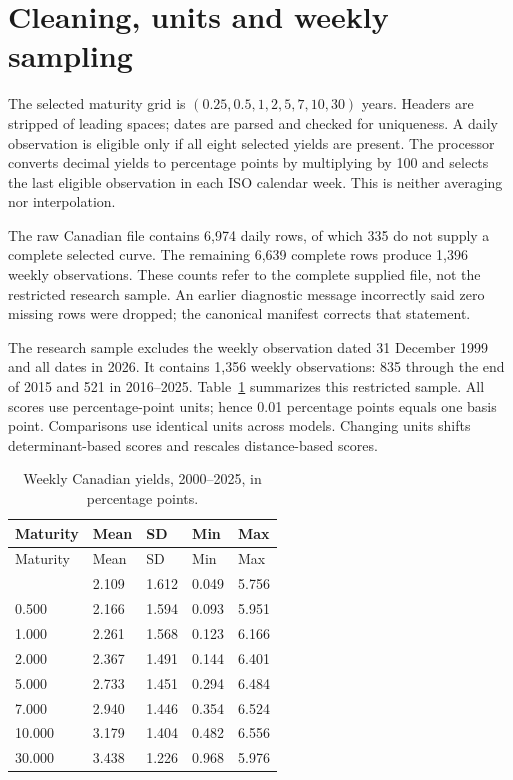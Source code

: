 \documentclass[
  12pt,
  letterpaper,
  DIV=11,
  numbers=noendperiod]{scrreprt}
\begin{document}
\section{Cleaning, units and weekly
sampling}\label{cleaning-units-and-weekly-sampling}

The selected maturity grid is \((0.25,0.5,1,2,5,7,10,30)\) years.
Headers are stripped of leading spaces; dates are parsed and checked for
uniqueness. A daily observation is eligible only if all eight selected
yields are present. The processor converts decimal yields to percentage
points by multiplying by 100 and selects the last eligible observation
in each ISO calendar week. This is neither averaging nor interpolation.

The raw Canadian file contains 6,974 daily rows, of which 335 do not
supply a complete selected curve. The remaining 6,639 complete rows
produce 1,396 weekly observations. These counts refer to the complete
supplied file, not the restricted research sample. An earlier diagnostic
message incorrectly said zero missing rows were dropped; the canonical
manifest corrects that statement.

The research sample excludes the weekly observation dated 31 December
1999 and all dates in 2026. It contains 1,356 weekly observations: 835
through the end of 2015 and 521 in 2016--2025. Table~\ref{tbl-data}
summarizes this restricted sample. All scores use percentage-point
units; hence 0.01 percentage points equals one basis point. Comparisons
use identical units across models. Changing units shifts
determinant-based scores and rescales distance-based scores.

\begin{longtable}[]{@{}lllll@{}}
\caption{Weekly Canadian yields, 2000--2025, in percentage
points.}\label{tbl-data}\tabularnewline
\toprule\noalign{}
Maturity & Mean & SD & Min & Max \\
\midrule\noalign{}
\endfirsthead
\toprule\noalign{}
Maturity & Mean & SD & Min & Max \\
\midrule\noalign{}
\endhead
\bottomrule\noalign{}
\endlastfoot
0.250 & 2.109 & 1.612 & 0.049 & 5.756 \\
0.500 & 2.166 & 1.594 & 0.093 & 5.951 \\
1.000 & 2.261 & 1.568 & 0.123 & 6.166 \\
2.000 & 2.367 & 1.491 & 0.144 & 6.401 \\
5.000 & 2.733 & 1.451 & 0.294 & 6.484 \\
7.000 & 2.940 & 1.446 & 0.354 & 6.524 \\
10.000 & 3.179 & 1.404 & 0.482 & 6.556 \\
30.000 & 3.438 & 1.226 & 0.968 & 5.976 \\
\end{longtable}
\end{document}
